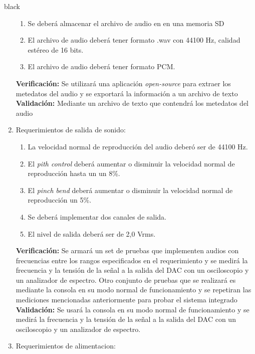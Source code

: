 \documentclass[11pt]{charter}
\begin{document}
\begin{consigna}{black}
\begin{enumerate}
	\begin{enumerate}
	\item Se deberá almacenar el archivo de audio en en una memoria SD
	\item El archivo de audio deberá tener formato .wav con 44100 Hz, calidad estéreo de 16 bits.
	\item El archivo de audio deberá tener formato PCM.
	\end{enumerate}

	\textbf{Verificación:} Se utilizará una aplicación \textit{open-source} para extraer los metedatos del audio y se exportará la información a un archivo de texto \newline \newline                                                                              
	\textbf{Validación:} Mediante un archivo de texto que contendrá los metedatos del audio
\item Requerimientos de salida de sonido:

	\begin{enumerate}
	\item La velocidad normal de reproducción del audio deberó ser de 44100 Hz.
	\item El \textit{pith control} deberá aumentar o disminuir la velocidad normal de reproducción hasta un un 8\%.
	\item El \textit{pinch bend} deberá aumentar o disminuir la velocidad normal de reproducción un 5\%.
	\item Se deberá implementar dos canales de salida.
	\item El nivel de salida deberá ser de 2,0 Vrms.
	\end{enumerate}

	\textbf{Verificación:} Se armará un set de pruebas que implementen audios con frecuencias entre los rangos especificados en el requerimiento y se medirá la frecuencia y la tensión de la señal a la salida del DAC con un osciloscopio y  un analizador de espectro. Otro conjunto de pruebas que se realizará es mediante la consola en su modo normal de funcionamiento y se repetiran las mediciones mencionadas anteriormente para probar el sistema integrado \newline                                                                              
	\newline 
	\textbf{Validación:} Se usará la consola en su modo normal de funcionamiento y se medirá la frecuencia y la tensión de la señal a la salida del DAC con un osciloscopio y  un analizador de espectro.
\item Requerimientos de alimentacion:


\end{enumerate}
\end{consigna}
\end{document}
